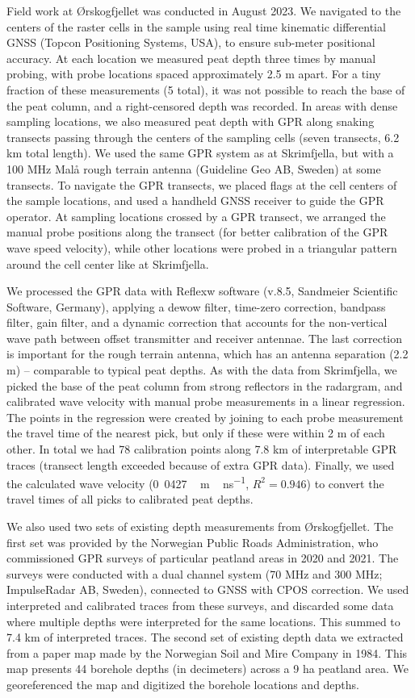 \documentclass[soil, manuscript]{copernicus}
\begin{document}
Field work at Ørskogfjellet was conducted in August 2023.
We navigated to the centers of the raster cells in the sample using real time kinematic differential GNSS (Topcon Positioning Systems, USA), to ensure sub-meter positional accuracy.
At each location we measured peat depth three times by manual probing, with probe locations spaced approximately 2.5 m apart.
For a tiny fraction of these measurements (5 total), it was not possible to reach the base of the peat column, and a right-censored depth was recorded.
In areas with dense sampling locations, we also measured peat depth with GPR along snaking transects passing through the centers of the sampling cells (seven transects, 6.2 km total length).
We used the same GPR system as at Skrimfjella, but with a 100 MHz Malå rough terrain antenna (Guideline Geo AB, Sweden) at some transects.
To navigate the GPR transects, we placed flags at the cell centers of the sample locations, and used a handheld GNSS receiver to guide the GPR operator.
At sampling locations crossed by a GPR transect, we arranged the manual probe positions along the transect (for better calibration of the GPR wave speed velocity), while other locations were probed in a triangular pattern around the cell center like at Skrimfjella.

We processed the GPR data with Reflexw software (v.8.5, Sandmeier Scientific Software, Germany), applying a dewow filter, time-zero correction, bandpass filter, gain filter, and a dynamic correction that accounts for the non-vertical wave path between offset transmitter and receiver antennae.
The last correction is important for the rough terrain antenna, which has an antenna separation (2.2 m) -- comparable to typical peat depths.
As with the data from Skrimfjella, we picked the base of the peat column from strong reflectors in the radargram, and calibrated wave velocity with manual probe measurements in a linear regression.
The points in the regression were created by joining to each probe measurement the travel time of the nearest pick, but only if these were within 2 m of each other.
In total we had 78 calibration points along 7.8 km of interpretable GPR traces (transect length exceeded because of extra GPR data).
Finally, we used the calculated wave velocity (\unit{0.0427\,m\,ns^{-1}}, \(R^2 = 0.946\)) to convert the travel times of all picks to calibrated peat depths.

We also used two sets of existing depth measurements from Ørskogfjellet.
The first set was provided by the Norwegian Public Roads Administration, who commissioned GPR surveys of particular peatland areas in 2020 and 2021.
The surveys were conducted with a dual channel system (70 MHz and 300 MHz; ImpulseRadar AB, Sweden), connected to GNSS with CPOS correction.
We used interpreted and calibrated traces from these surveys, and discarded some data where multiple depths were interpreted for the same locations.
This summed to 7.4 km of interpreted traces.
The second set of existing depth data we extracted from a paper map made by the Norwegian Soil and Mire Company in 1984.
This map presents 44 borehole depths (in decimeters) across a 9 ha peatland area.
We georeferenced the map and digitized the borehole locations and depths.
\end{document}
